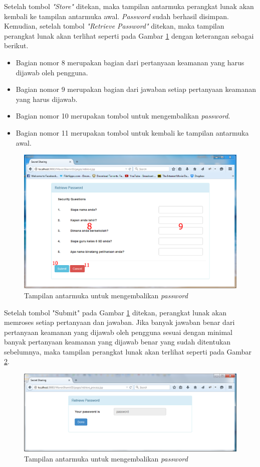 Setelah tombol \textit{"Store"} ditekan, maka tampilan antarmuka perangkat lunak akan kembali ke tampilan antarmuka awal. \textit{Password} sudah berhasil disimpan. Kemudian, setelah tombol \textit{"Retrieve Password"} ditekan, maka tampilan perangkat lunak akan terlihat seperti pada Gambar \ref{fig:tampilan3} dengan keterangan sebagai berikut.

\begin{itemize}
	\item Bagian nomor 8 merupakan bagian dari pertanyaan keamanan yang harus dijawab oleh pengguna.
	\item Bagian nomor 9 merupakan bagian dari jawaban setiap pertanyaan keamanan yang harus dijawab.
	\item Bagian nomor 10 merupakan tombol untuk mengembalikan \textit{password}.
	\item Bagian nomor 11 merupakan tombol untuk kembali ke tampilan antarmuka awal.
\end{itemize}

\begin{figure}[H]
	\includegraphics[scale=0.5]{Gambar/tampilan3}
	\centering
	\caption{Tampilan antarmuka untuk mengembalikan \textit{password}}\label{fig:tampilan3}
\end{figure}

Setelah tombol "Submit" pada Gambar \ref{fig:tampilan3} ditekan, perangkat lunak akan memroses setiap pertanyaan dan jawaban. Jika banyak jawaban benar dari pertanyaan keamanan yang dijawab oleh pengguna sesuai dengan minimal banyak pertanyaan keamanan yang dijawab benar yang sudah ditentukan sebelumnya, maka tampilan perangkat lunak akan terlihat seperti pada Gambar \ref{fig:tampilan4}.

\begin{figure}[H]
	\includegraphics[scale=0.5]{Gambar/tampilan4}
	\centering
	\caption{Tampilan antarmuka untuk mengembalikan \textit{password}}\label{fig:tampilan4}
\end{figure}

